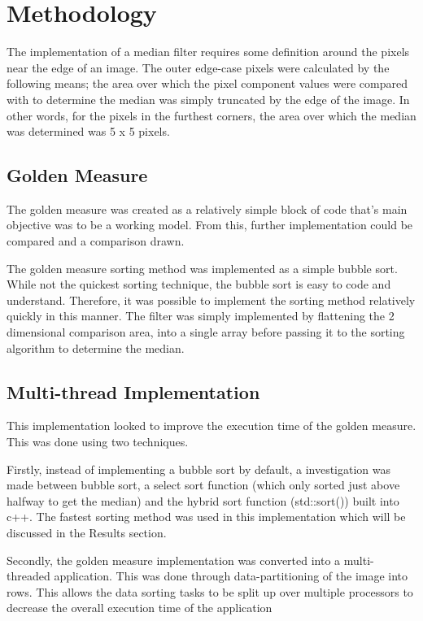 \section{Methodology}
The implementation of a median filter requires some definition around the pixels near the edge of an image. The outer edge-case pixels were calculated by the following means; the area over which the pixel component values were compared with to determine the median was simply truncated by the edge of the image. In other words, for the pixels in the furthest corners, the area over which the median was determined was 5 x 5 pixels.

\subsection{Golden Measure}
The golden measure was created as a relatively simple block of code that's main objective was to be a working model. From this, further implementation could be compared and a comparison drawn.

The golden measure sorting method was implemented as a simple bubble sort. While not the quickest sorting technique, the bubble sort is easy to code and understand. Therefore, it was possible to implement the sorting method relatively quickly in this manner. The filter was simply implemented by flattening the 2 dimensional comparison area, into a single array before passing it to the sorting algorithm to determine the median.

\subsection{Multi-thread Implementation}
This implementation looked to improve the execution time of the golden measure. This was done using two techniques. 

Firstly, instead of implementing a bubble sort by default, a investigation was made between bubble sort, a select sort function (which only sorted just above halfway to get the median) and the hybrid sort function (std::sort()) built into c++. The fastest sorting method was used in this implementation which will be discussed in the Results section.

Secondly, the golden measure implementation was converted into a multi-threaded application. This was done through data-partitioning of the image into rows. This allows the data sorting tasks to be split up over multiple processors to decrease the overall execution time of the application
  
